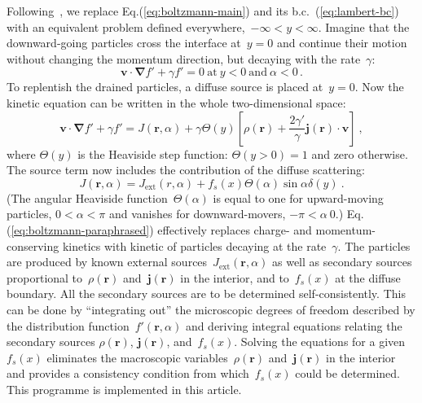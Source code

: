 \documentclass[preprint,aps,eqsecnum, prb]{revtex4-1}
\begin{document}
Following~\cite{bib:Reuter-Sondheimer},  we replace Eq.(\ref{eq:boltzmann-main})
and its b.c.~(\ref{eq:lambert-bc}) with an equivalent
problem defined everywhere,~$-\infty < y < \infty$.
Imagine that the downward-going particles
cross the interface at~$y = 0$ and continue their motion without changing
the momentum direction, but  decaying with the rate~$\gamma$:
\begin{equation}
{\bm v}\cdot{\bm \nabla} f' + \gamma f' = 0
\ \mathrm{at}\ y < 0\  \mathrm{and}\ \alpha < 0\,.
\end{equation}
To replentish the drained particles, a diffuse source is placed
at~$y = 0$. Now the kinetic equation can be written in the whole
two-dimensional space:
\begin{equation}
  \label{eq:boltzmann-paraphrased}
  {\bm v} \cdot {\bm \nabla} f' + \gamma f' = J({\bm r}, \alpha)
  + \gamma \Theta(y)\left[\rho({\bm r}) + \frac{2\gamma'}{\gamma} {\bm j}({\bm r})\cdot{\bm v}
  \right] \ ,
\end{equation}
where $\Theta(y)$ is the Heaviside step function:
$\Theta(y>0) = 1$ and zero otherwise.
The source term now includes the contribution of the diffuse scattering:
\begin{equation}
  J({\bm r}, \alpha) = J_\mathrm{ext}(r, \alpha)
  + f_s(x)  \Theta(\alpha) \sin\alpha  \delta(y)\ .
\end{equation}
(The angular Heaviside function~$\Theta(\alpha)$ is equal to
one for upward-moving particles, $0 < \alpha < \pi$ and vanishes
for downward-movers, $-\pi < \alpha \ 0$.)
Eq.(\ref{eq:boltzmann-paraphrased}) effectively replaces charge- and
momentum-conserving kinetics with kinetic of particles decaying
at the rate~$\gamma$. The particles are produced by known external
sources~$J_\mathrm{ext}({\bm r}, \alpha)$ as well as secondary sources
proportional to~$\rho({\bm r})$ and~${\bm j}({\bm r})$ in the interior,
and to~$f_s(x)$ at the diffuse boundary. All the secondary sources are to
be determined self-consistently. This can be done by ``integrating out''
the microscopic degrees of freedom described by the distribution
function~$f'({\bm r}, \alpha)$
and deriving integral equations relating the secondary sources
$\rho({\bm r})$, ${\bm j}({\bm r})$, and~$f_s(x)$. Solving
the equations for a given~$f_s(x)$ eliminates the macroscopic
variables~$\rho({\bm r})$ and~${\bm j}({\bm r})$ in the interior
and provides a consistency condition from which~$f_s(x)$ could be determined.
This programme is implemented in this article.
\end{document}
